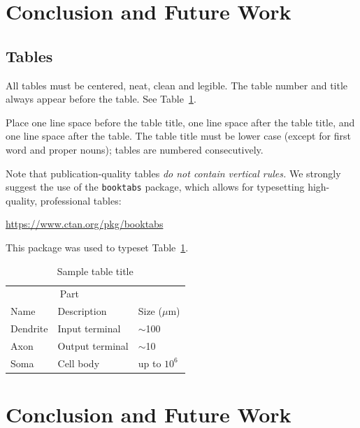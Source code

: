 \documentclass{article}
\begin{document}
\section{Conclusion and Future Work}





\subsection{Tables}

All tables must be centered, neat, clean and legible.  The table
number and title always appear before the table.  See
Table~\ref{sample-table}.

Place one line space before the table title, one line space after the
table title, and one line space after the table. The table title must
be lower case (except for first word and proper nouns); tables are
numbered consecutively.

Note that publication-quality tables \emph{do not contain vertical
  rules.} We strongly suggest the use of the \verb+booktabs+ package,
which allows for typesetting high-quality, professional tables:
\begin{center}
  \url{https://www.ctan.org/pkg/booktabs}
\end{center}
This package was used to typeset Table~\ref{sample-table}.

\begin{table}[t]
  \caption{Sample table title}
  \label{sample-table}
  \centering
  \begin{tabular}{lll}
    \toprule
    \multicolumn{2}{c}{Part}                   \\
    \cmidrule{1-2}
    Name     & Description     & Size ($\mu$m) \\
    \midrule
    Dendrite & Input terminal  & $\sim$100     \\
    Axon     & Output terminal & $\sim$10      \\
    Soma     & Cell body       & up to $10^6$  \\
    \bottomrule
  \end{tabular}
\end{table}




\section{Conclusion and Future Work}
\end{document}
